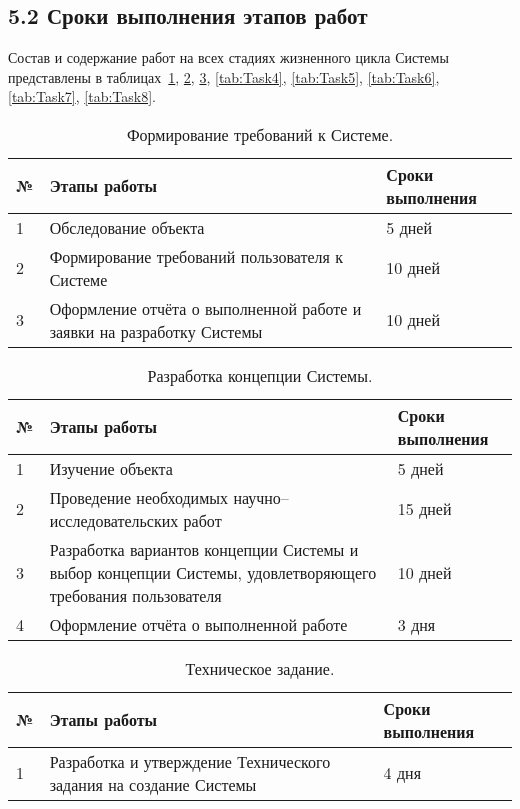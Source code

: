 \subsection*{5.2 Сроки выполнения этапов работ}
Состав и содержание работ на всех стадиях жизненного цикла
Системы представлены в таблицах~\ref{tab:Task1},
\ref{tab:Task2}, \ref{tab:Task3}, \ref{tab:Task4},
\ref{tab:Task5}, \ref{tab:Task6}, \ref{tab:Task7},
\ref{tab:Task8}.

\begin{table}[H]
\caption{\label{tab:Task1}
Формирование требований к Системе.}
\begin{center}
\begin{tabular}{|p{1cm}||p{9cm}|p{4cm}|}
\hline
№ & Этапы работы & Сроки выполнения \\
\hline
\hline
1 & Обследование объекта & 5 дней \\
\hline
2 & Формирование требований пользователя к Системе & 10 дней \\
\hline
3 & Оформление отчёта о выполненной работе и
заявки на разработку Системы & 10 дней \\
\hline
\end{tabular}
\end{center}
\end{table}
\begin{table}[H]
\caption{\label{tab:Task2}
Разработка концепции Системы.}
\begin{center}
\begin{tabular}{|p{1cm}||p{9cm}|p{4cm}|}
\hline
№ & Этапы работы & Сроки выполнения \\
\hline
\hline
1 & Изучение объекта & 5 дней \\
\hline
2 & Проведение необходимых научно--исследовательских
работ & 15 дней \\
\hline
3 & Разработка вариантов концепции Системы и выбор
концепции Системы, удовлетворяющего требования
пользователя & 10 дней \\
\hline
4 & Оформление отчёта о выполненной работе & 3 дня \\
\hline
\end{tabular}
\end{center}
\end{table}
\begin{table}[H]
\caption{\label{tab:Task3}
Техническое задание.}
\begin{center}
\begin{tabular}{|p{1cm}||p{9cm}|p{4cm}|}
\hline
№ & Этапы работы & Сроки выполнения \\
\hline
\hline
1 & Разработка и утверждение Технического задания на
создание Системы & 4 дня \\
\hline
\end{tabular}
\end{center}
\end{table}
